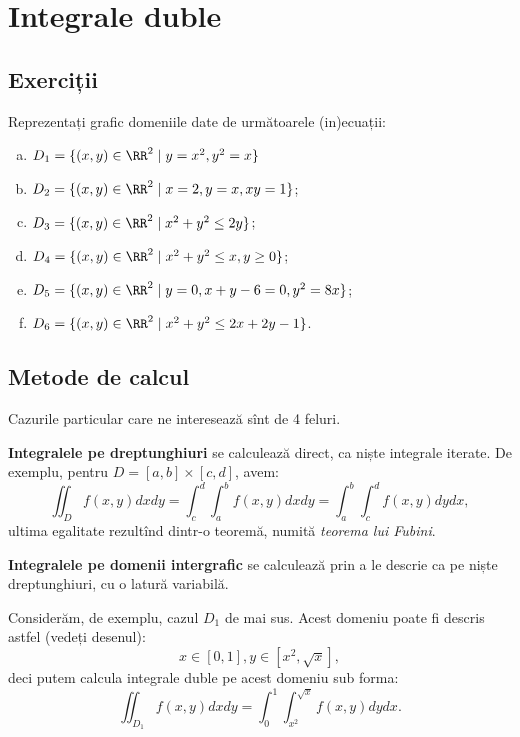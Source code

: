 \chapter{Integrale duble}

\section{Exerciții}

Reprezentați grafic domeniile date de următoarele (in)ecuații:
\begin{enumerate}[(a)]
    \item $ D_1 = \{ (x, y) \in \RR^2 \mid y = x^2, y^2 = x \} $
    \item $ D_2 = \{ (x, y) \in \RR^2 \mid x = 2, y = x, xy = 1 \} $;
    \item $ D_3 = \{ (x, y) \in \RR^2 \mid x^2 + y^2 \leq 2y \} $;
    \item $ D_4 = \{ (x, y) \in \RR^2 \mid x^2 + y^2 \leq x, y \geq 0 \} $;
    \item $ D_5 = \{ (x, y) \in \RR^2 \mid y = 0, x + y - 6 = 0, y^2 = 8x \} $;
    \item $ D_6 = \{ (x, y) \in \RR^2 \mid x^2 + y^2 \leq 2x + 2y - 1 \} $.
\end{enumerate}

\section{Metode de calcul}

Cazurile particular care ne interesează sînt de 4 feluri.

\textbf{Integralele pe dreptunghiuri} se calculează direct, ca niște
integrale iterate. De exemplu, pentru $ D = [a, b] \times [c, d] $,
avem:
\[
    \iint_D f(x, y) dxdy = \int_c^d \int_a^b f(x, y) dxdy = %
    \int_a^b \int_c^d f(x, y) dydx,
\]
ultima egalitate rezultînd dintr-o teoremă, numită \textit{teorema lui %
Fubini}.

\textbf{Integralele pe domenii intergrafic} se calculează prin a le descrie
ca pe niște dreptunghiuri, cu o latură variabilă.

Considerăm, de exemplu, cazul $ D_1 $ de mai sus. Acest domeniu poate fi
descris astfel (vedeți desenul):
\[
    x \in [0, 1], y \in [x^2, \sqrt{x}],
\]
deci putem calcula integrale duble pe acest domeniu sub forma:
\[
    \iint_{D_1} f(x, y) dxdy = \int_0^1 \int_{x^2}^{\sqrt{x}} f(x, y) dy dx.
\]

